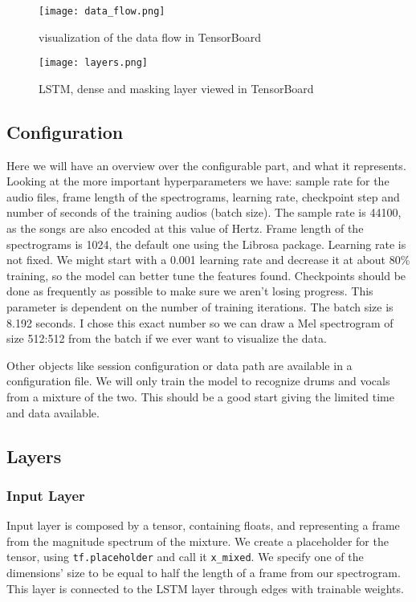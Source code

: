 \documentclass[../Thesis.tex]{subfiles}
\begin{document}
\begin{figure}[h]
\centering
\label {fig: data_flow}
\texttt{[image: data\_flow.png]}
\caption[width=0.5\textwidth]{visualization of the data flow in TensorBoard}
\end{figure}

\begin{figure}[h]
\centering
\label {fig: layers}
\texttt{[image: layers.png]}
\caption[width=0.5\textwidth]{LSTM, dense and masking layer viewed in TensorBoard}
\end{figure}

\subsection {Configuration}

Here we will have an overview over the configurable part, and what it represents. Looking at the more important hyperparameters we have: sample rate for the audio files, frame length of the spectrograms, learning rate, checkpoint step and number of seconds of the training audios (batch size). The sample rate is 44100, as the songs are also encoded at this value of Hertz. Frame length of the spectrograms is 1024, the default one using the Librosa package. Learning rate is not fixed. We might start with a 0.001 learning rate and decrease it at about 80\% training, so the model can better tune the features found. Checkpoints should be done as frequently as possible to make sure we aren’t losing progress. This parameter is dependent on the number of training iterations. The batch size is 8.192 seconds. I chose this exact number so we can draw a Mel spectrogram of size 512:512 from the batch if we ever want to visualize the data.

Other objects like session configuration or data path are available in a configuration file. 
We will only train the model to recognize drums and vocals from a mixture of the two. This should be a good start giving the limited time and data available. 


\subsection {Layers}
\subsubsection {Input Layer}

Input layer is composed by a tensor, containing floats, and representing a frame from the magnitude spectrum of the mixture. We create a placeholder for the tensor, using \texttt{tf.placeholder} and call it \texttt{x\_mixed}. We specify one of the dimensions’ size to be equal to half the length of a frame from our spectrogram. This layer is connected to the LSTM layer through edges with trainable weights.
\end{document}
